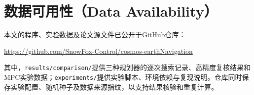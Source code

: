 \section*{数据可用性（Data Availability）}
本文的程序、实验数据及论文源文件已公开于GitHub仓库：
\par\noindent\url{https://github.com/SnowFox-Control/cosmos-earthNavigation}\par
其中，\texttt{results/comparison/}提供三种规划器的逐次搜索记录、高精度复核结果和MPC实验数据；\texttt{experiments/}提供实验脚本、环境依赖与复现说明。仓库同时保存实验配置、随机种子及数据来源指纹，以支持结果核验和重复计算。

